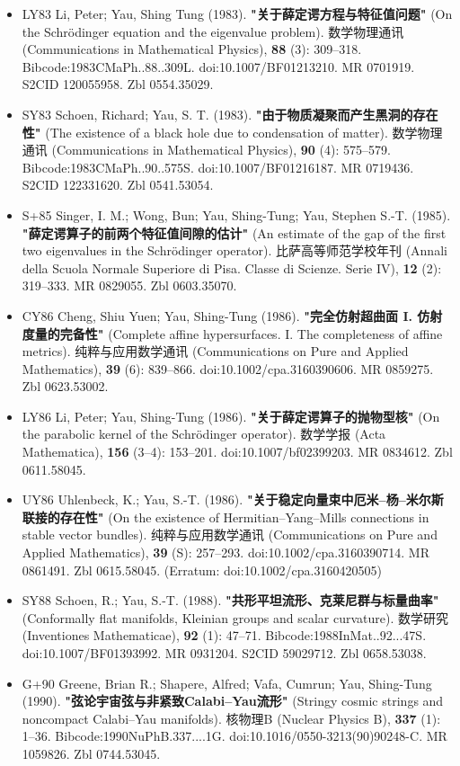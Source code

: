 \begin{itemize}
\item LY83 Li, Peter; Yau, Shing Tung (1983). \textbf{"关于薛定谔方程与特征值问题" }(On the Schrödinger equation and the eigenvalue problem). 数学物理通讯 (Communications in Mathematical Physics), \textbf{88} (3): 309–318. Bibcode:1983CMaPh..88..309L. doi:10.1007/BF01213210. MR 0701919. S2CID 120055958. Zbl 0554.35029.
\item SY83 Schoen, Richard; Yau, S. T. (1983). \textbf{"由于物质凝聚而产生黑洞的存在性"} (The existence of a black hole due to condensation of matter). 数学物理通讯 (Communications in Mathematical Physics), \textbf{90} (4): 575–579. Bibcode:1983CMaPh..90..575S. doi:10.1007/BF01216187. MR 0719436. S2CID 122331620. Zbl 0541.53054.
\item S+85 Singer, I. M.; Wong, Bun; Yau, Shing-Tung; Yau, Stephen S.-T. (1985). \textbf{"薛定谔算子的前两个特征值间隙的估计"} (An estimate of the gap of the first two eigenvalues in the Schrödinger operator). 比萨高等师范学校年刊 (Annali della Scuola Normale Superiore di Pisa. Classe di Scienze. Serie IV), \textbf{12} (2): 319–333. MR 0829055. Zbl 0603.35070.
\item CY86 Cheng, Shiu Yuen; Yau, Shing-Tung (1986). \textbf{"完全仿射超曲面 I. 仿射度量的完备性"} (Complete affine hypersurfaces. I. The completeness of affine metrics). 纯粹与应用数学通讯 (Communications on Pure and Applied Mathematics), \textbf{39} (6): 839–866. doi:10.1002/cpa.3160390606. MR 0859275. Zbl 0623.53002.
\item LY86  Li, Peter; Yau, Shing-Tung (1986). \textbf{"关于薛定谔算子的抛物型核"} (On the parabolic kernel of the Schrödinger operator). 数学学报 (Acta Mathematica), \textbf{156} (3–4): 153–201. doi:10.1007/bf02399203. MR 0834612. Zbl 0611.58045.
\item UY86 Uhlenbeck, K.; Yau, S.-T. (1986). \textbf{"关于稳定向量束中厄米–杨–米尔斯联接的存在性" }(On the existence of Hermitian–Yang–Mills connections in stable vector bundles). 纯粹与应用数学通讯 (Communications on Pure and Applied Mathematics), \textbf{39} (S): 257–293. doi:10.1002/cpa.3160390714. MR 0861491. Zbl 0615.58045. (Erratum: doi:10.1002/cpa.3160420505)
\item SY88 Schoen, R.; Yau, S.-T. (1988). \textbf{"共形平坦流形、克莱尼群与标量曲率"} (Conformally flat manifolds, Kleinian groups and scalar curvature). 数学研究 (Inventiones Mathematicae), \textbf{92} (1): 47–71. Bibcode:1988InMat..92...47S. doi:10.1007/BF01393992. MR 0931204. S2CID 59029712. Zbl 0658.53038.
\item G+90 Greene, Brian R.; Shapere, Alfred; Vafa, Cumrun; Yau, Shing-Tung (1990). \textbf{"弦论宇宙弦与非紧致Calabi–Yau流形"} (Stringy cosmic strings and noncompact Calabi–Yau manifolds). 核物理B (Nuclear Physics B), \textbf{337} (1): 1–36. Bibcode:1990NuPhB.337....1G. doi:10.1016/0550-3213(90)90248-C. MR 1059826. Zbl 0744.53045.

\end{itemize}
